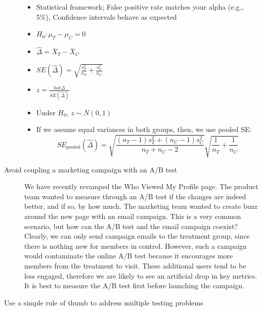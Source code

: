 \begin{description}
\begin{tcolorbox}[colback=green!5!white,colframe=green!80!black,title=\textbf{A/A test}]
\begin{itemize}
\item Statistical framework;
False positive rate matches your alpha (e.g., 5\%),
Confidence intervals behave as expected
\end{itemize}
\end{tcolorbox}

\begin{itemize}
\item $H_0: \mu_T - \mu_C = 0$

\item $\hat \Delta = \bar{X}_T - \bar{X}_C$

\item $SE(\hat \Delta) = \sqrt{\frac{s_T^2}{n_T} + \frac{s_C^2}{n_C}}$

\item $z = \frac{hat \Delta }{SE(\hat \Delta) }$

\item Under $H_0$, $z \sim N(0, 1)$

\item If we assume equal variances in both groups, then, we use pooled SE:
 \[SE_{\text{pooled}}(\hat \Delta) = \sqrt{\frac{(n_T-1)s_T^2 + (n_C - 1)s_C^2 }{n_T + n_C - 2}} \sqrt{\frac{1}{n_T} + \frac{1}{n_C} }\]
\end{itemize}


\item [Avoid coupling a marketing campaign with an A/B test]

We have recently revamped the Who Viewed My Profile page. 
The product team wanted to measure through an A/B test if the changes are indeed better, and if so, by how much. 
The marketing team wanted to create buzz around the new page with an email campaign. 
This is a very common scenario, but how can the A/B test and the email campaign coexist? 
Clearly, we can only send campaign emails to the treatment group, since there is nothing new for members in control. 
However, such a campaign would contaminate the online A/B test because it encourages more members from the treatment to visit. 
These additional users tend to be less engaged, therefore we are likely to see an artificial drop in key metrics. 
It is best to measure the A/B test first before launching the campaign.

\item [Use a simple rule of thumb to address multiple testing problems]


\end{description}
